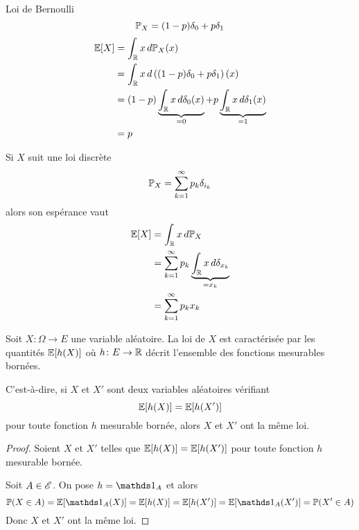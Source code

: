 \begin{exs}
    Loi de Bernoulli
    \begin{equation*}
        \mathbb{P}_X = (1-p)\delta_0 + p\delta_1\\
    \end{equation*}
    \begin{equation*}
        \begin{aligned}
            \mathbb{E}\mathopen{}\left[X\right]\mathclose{} 
            &= \int_{\mathbb{R}} x\mathop{}\!{d}\mathbb{P}_X(x) \\
            &= \int_{\mathbb{R}} x \mathop{}\!{d}\left((1-p)\delta_0 + p\delta_1\right)(x)\\
            &=(1-p)\underbrace{\int_{\mathbb{R}} x \mathop{}\!{d}\delta_0(x)}_{=0} + p \underbrace{\int_{\mathbb{R}} x\mathop{}\!{d}\delta_1(x)}_{=1}\\
            &= p
        \end{aligned}
    \end{equation*}

    Si \(X\) suit une loi discrète
    \begin{equation*}
        \mathbb{P}_X = \sum_{k=1}^{\infty}p_k\delta_{i_k}
    \end{equation*}
    alors son espérance vaut
    \begin{equation*}
        \begin{aligned}
            \mathbb{E}\mathopen{}\left[X\right]\mathclose{}
            &= \int_{\mathbb{R}} x\mathop{}\!{d}\mathbb{P}_X\\
            &=\sum_{k=1}^\infty p_k \underbrace{\int_{\mathbb{R}} x\mathop{}\!{d}\delta_{x_k}}_{=x_k}\\
            &=\sum_{k=1}^{\infty} p_k x_k
        \end{aligned}
    \end{equation*}
\end{exs}

\begin{proposition}
    Soit \(X\colon \Omega\to E\) une variable aléatoire.
    La loi de \(X\) est caractérisée par les quantités
    \(\mathbb{E}\mathopen{}\left[h(X)\right]\mathclose{}\) où \(h\colon E\to\mathbb{R}\) décrit l'ensemble
    des fonctions mesurables bornées. 

    C'est-à-dire, si \(X\) et \(X'\) sont deux variables aléatoires
    vérifiant
    \begin{equation*}
        \mathbb{E}\mathopen{}\left[h(X)\right]\mathclose{} = \mathbb{E}\mathopen{}\left[h(X')\right]\mathclose{}
    \end{equation*}
    pour toute fonction \(h\) mesurable bornée, alors \(X\) et \(X'\)
    ont la même loi.
\end{proposition}

\begin{proof}
    Soient \(X\) et \(X'\) telles que \(\mathbb{E}\mathopen{}\left[h(X)\right]\mathclose{} = \mathbb{E}\mathopen{}\left[h(X')\right]\mathclose{}\)
    pour toute fonction \(h\) mesurable bornée.

    Soit \(A\in\mathscr{E}\). On pose \(h = \one_A\) et alors
    \begin{equation*}
        \bb P(X\in A) = \bb E\ff{\one_A(X)} = \bb E\ff{h(X)} = \bb E\ff{h(X')} = \bb E\ff{\one_A(X')} = \bb P(X'\in A)
    \end{equation*}
    Donc \(X\) et \(X'\) ont la même loi.
\end{proof}

